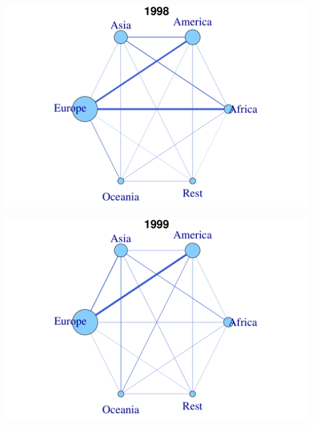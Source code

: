 \documentclass[a4paper,ngerman,oneside,titlepage,bibliography=totoc,11pt]{scrreprt}
\begin{document}
\begin{minipage}[t]{0.48\textwidth}
		\centering
			\includegraphics[width=1\textwidth]{Grafiken/Cont_Ani/cont7.pdf}
\end{minipage}	
\hfill	
\begin{minipage}[t]{0.48\textwidth}	
			\centering
			\includegraphics[width=1\textwidth]{Grafiken/Cont_Ani/cont8.pdf}
\end{minipage}
\end{document}

